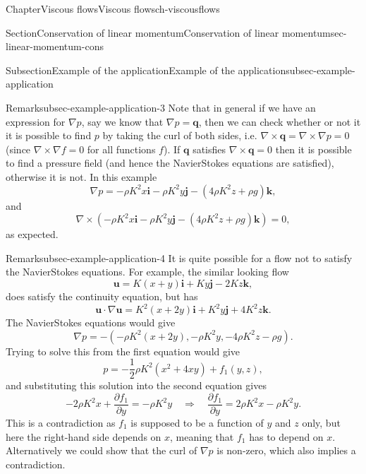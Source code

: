 \documentclass[oneside,10pt,]{book}
\numberwithin{equation}{section}
\newcommand{\pd}[2]{\frac{\partial#1}{\partial#2}}
\newcommand{\bu}{\boldsymbol{u}}
\newcommand{\bi}{\boldsymbol{i}}
\newcommand{\bj}{\boldsymbol{j}}
\newcommand{\bk}{\boldsymbol{k}}
\newcommand{\bq}{\boldsymbol{q}}
\begin{document}
\begin{chapterptx}{Chapter}{Viscous flows}{}{Viscous flows}{}{}{ch-viscousflows}
\begin{sectionptx}{Section}{Conservation of linear momentum}{}{Conservation of linear momentum}{}{}{sec-linear-momentum-cons}
\begin{subsectionptx}{Subsection}{Example of the application}{}{Example of the application}{}{}{subsec-example-application}
\begin{remark}{Remark}{}{subsec-example-application-3}%
Note that in general if we have an expression for \(\nabla p\), say we know that \(\nabla p={\bq}\), then we can check whether or not it it is possible to find \(p\) by taking the curl of both sides, i.e. \(\nabla\times{\bq}=\nabla\times\nabla p=0\) (since \(\nabla\times\nabla f=0\) for all functions \(f\)). If \({\bq}\) satisfies \(\nabla\times{\bq}=0\) then it is possible to find a pressure field (and hence the Navier\textendash{}Stokes equations are satisfied), otherwise it is not.  In this example%
\begin{equation*}
\nabla p=-\rho K^2x\bi-\rho K^2y\bj
-(4\rho K^2z+\rho g)\bk,
\end{equation*}
and%
\begin{equation*}
\nabla\times\left(-\rho K^2x\bi-\rho K^2y\bj
-(4\rho K^2z+\rho g)\bk\right)=0,
\end{equation*}
as expected.%
\end{remark}
\begin{remark}{Remark}{}{subsec-example-application-4}%
It is quite possible for a flow not to satisfy the Navier\textendash{}Stokes equations. For example, the similar looking flow%
\begin{equation}
\bu=K(x+y)\bi+Ky\bj-2Kz\bk,\label{eq-altflow}
\end{equation}
does satisfy the continuity equation, but has%
\begin{equation*}
\bu\cdot\nabla\bu=K^2(x+2y)\bi+K^2y\bj+4K^2z\bk.
\end{equation*}
The Navier\textendash{}Stokes equations would give%
\begin{equation*}
\nabla p=-\left(-\rho K^2(x+2y),-\rho K^2y,-4\rho K^2z-\rho g\right).
\end{equation*}
Trying to solve this from the first equation would give%
\begin{equation*}
p=-\frac12\rho K^2(x^2+4xy)+f_1(y,z),
\end{equation*}
and substituting this solution into the second equation gives%
\begin{equation*}
-2\rho K^2x+\pd{f_1}{y}=-\rho K^2y\quad\Rightarrow\quad
\pd{f_1}{y}=2\rho K^2x-\rho K^2y.
\end{equation*}
This is a contradiction as \(f_1\) is supposed to be a function of \(y\) and \(z\) only, but here the right-hand side depends on \(x\), meaning that \(f_1\) has to depend on \(x\). Alternatively we could show that the curl of \(\nabla p\) is non-zero, which also implies a contradiction.%

\end{remark}
\end{subsectionptx}
\end{sectionptx}
\end{chapterptx}
\end{document}
